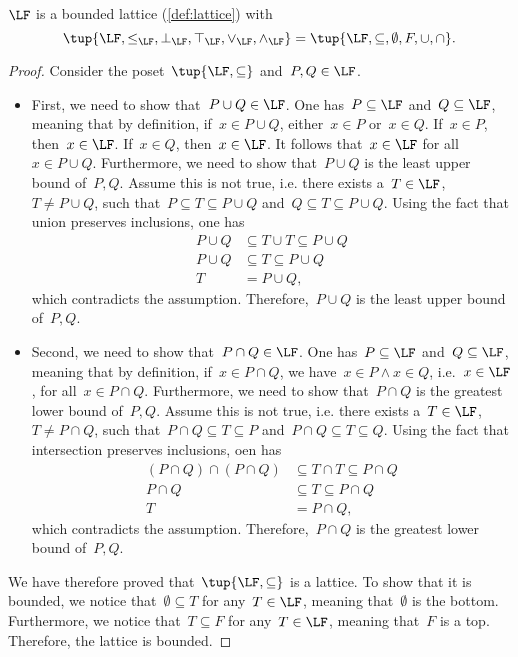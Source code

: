 \begin{lemma}
  $\LF$ is a bounded lattice (\cref{def:lattice}) with
  \begin{equation}
    \tup{\LF,\leq_{\LF},\bot_{\LF},\top_{\LF},\vee_{\LF},\wedge_{\LF}}=\tup{\LF,\subseteq,\emptyset,F,\cup,\cap}.
  \end{equation}
\end{lemma}
\begin{proof}
  Consider the poset~$\tup{\LF,\subseteq}$ and~$P,Q\in \LF$.
  \begin{itemize}
    \item First, we need to show that~$P\cup Q\in \LF$. One has~$P \subseteq \LF$ and~$Q\subseteq \LF$, meaning that by definition, if~$x\in P\cup Q$, either~$x\in P$ or~$x\in Q$. If~$x\in P$, then~$x\in \LF$. If~$x\in Q$, then~$x\in \LF$. It follows that~$x\in \LF$ for all~$x\in P\cup Q$. Furthermore, we need to show that~$P\cup Q$ is the least upper bound of~$P,Q$. Assume this is not true, i.e. there exists a~$T\in \LF$,~$T\neq P\cup Q$, such that~$P\subseteq T\subseteq P\cup Q$ and~$Q\subseteq T\subseteq P\cup Q$. Using the fact that union preserves inclusions, one has
    \begin{equation}
      \begin{aligned}
        P\cup Q &\subseteq T\cup T \subseteq P\cup Q\\
        P\cup Q &\subseteq T \subseteq P\cup Q\\
        T&= P\cup Q,
      \end{aligned}
    \end{equation}
    which contradicts the assumption. Therefore,~$P\cup Q$ is the least upper bound of~$P,Q$.
    \item Second, we need to show that~$P\cap Q\in \LF$. One has~$P\subseteq \LF$ and~$Q\subseteq \LF$, meaning that by definition, if~$x\in P\cap Q$, we have~$x\in P\wedge x\in Q$, i.e.~$x\in \LF$, for all~$x\in P\cap Q$. Furthermore, we need to show that~$P\cap Q$ is the greatest lower bound of~$P,Q$. Assume this is not true, i.e. there exists a~$T\in \LF$,~$T\neq P\cap Q$, such that~$P\cap Q\subseteq T\subseteq P$ and~$P\cap Q\subseteq T\subseteq Q$. Using the fact that intersection preserves inclusions, oen has
    \begin{equation}
      \begin{aligned}
      (P\cap Q)
        \cap (P\cap Q) &\subseteq T \cap T \subseteq P\cap Q\\
        P\cap Q &\subseteq T\subseteq P\cap Q\\
        T&=P\cap Q,
      \end{aligned}
    \end{equation}
    which contradicts the assumption. Therefore,~$P\cap Q$ is the greatest lower bound of~$P,Q$.
  \end{itemize}
  We have therefore proved that~$\tup{\LF,\subseteq}$ is a lattice. To show that it is bounded, we notice that~$\emptyset \subseteq T$ for any~$T\in \LF$, meaning that~$\emptyset$ is the bottom. Furthermore, we notice that~$T\subseteq F$ for any~$T\in \LF$, meaning that~$F$ is a top. Therefore, the lattice is bounded.
\end{proof}
